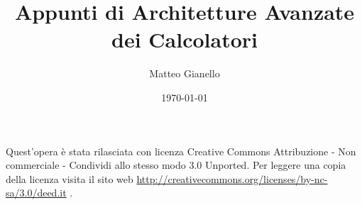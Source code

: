 \documentclass[a4paper,11pt, twoside]{article}
\title{Appunti di Architetture Avanzate dei Calcolatori}
\author{Matteo Gianello}
\date{\today}
\theoremstyle{definition}
\begin{document}
\pagestyle{empty}
\thispagestyle{empty}
\maketitle
\vspace{5cm}
\begin{center}
Quest'opera è stata rilasciata con licenza Creative Commons Attribuzione - Non commerciale - Condividi allo stesso modo 3.0 Unported. Per leggere una copia della licenza visita il sito web \url{http://creativecommons.org/licenses/by-nc-sa/3.0/deed.it} \ccbyncsa.
\end{center}
\newpage

\thispagestyle{plain}
\tableofcontents
\newpage

\pagestyle{plain}

%
%
%
%
\end{document}
